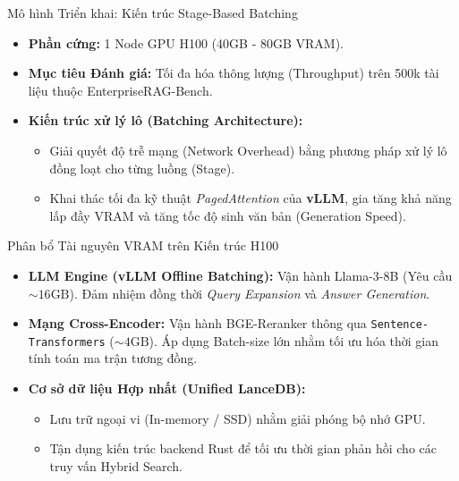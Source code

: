 \documentclass[aspectratio=169, xcolor=table]{beamer}
\begin{document}
\begin{frame}{Mô hình Triển khai: Kiến trúc Stage-Based Batching}
    \begin{itemize}
        \item[\faMicrochip] \textbf{Phần cứng:} 1 Node GPU H100 (40GB - 80GB VRAM).
        \item[\faTrophy] \textbf{Mục tiêu Đánh giá:} Tối đa hóa thông lượng (Throughput) trên 500k tài liệu thuộc EnterpriseRAG-Bench.
        \item[\faCode] \textbf{Kiến trúc xử lý lô (Batching Architecture):} 
        \begin{itemize}
            \footnotesize
            \item Giải quyết độ trễ mạng (Network Overhead) bằng phương pháp xử lý lô đồng loạt cho từng luồng (Stage).
            \item Khai thác tối đa kỹ thuật \textit{PagedAttention} của \textbf{vLLM}, gia tăng khả năng lấp đầy VRAM và tăng tốc độ sinh văn bản (Generation Speed).
        \end{itemize}
    \end{itemize}
\end{frame}

\begin{frame}{Phân bổ Tài nguyên VRAM trên Kiến trúc H100}
    \begin{infobox}
        \begin{itemize}
            \item \textbf{LLM Engine (vLLM Offline Batching):} Vận hành Llama-3-8B (Yêu cầu $\sim 16\text{GB}$). Đảm nhiệm đồng thời \textit{Query Expansion} và \textit{Answer Generation}.
            \item \textbf{Mạng Cross-Encoder:} Vận hành BGE-Reranker thông qua \texttt{Sentence-Transformers} ($\sim 4\text{GB}$). Áp dụng Batch-size lớn nhằm tối ưu hóa thời gian tính toán ma trận tương đồng.
            \item \textbf{Cơ sở dữ liệu Hợp nhất (Unified LanceDB):} 
            \begin{itemize}
                \item Lưu trữ ngoại vi (In-memory / SSD) nhằm giải phóng bộ nhớ GPU.
                \item Tận dụng kiến trúc backend Rust để tối ưu thời gian phản hồi cho các truy vấn Hybrid Search.
            \end{itemize}
        \end{itemize}
    \end{infobox}
\end{frame}
\end{document}
